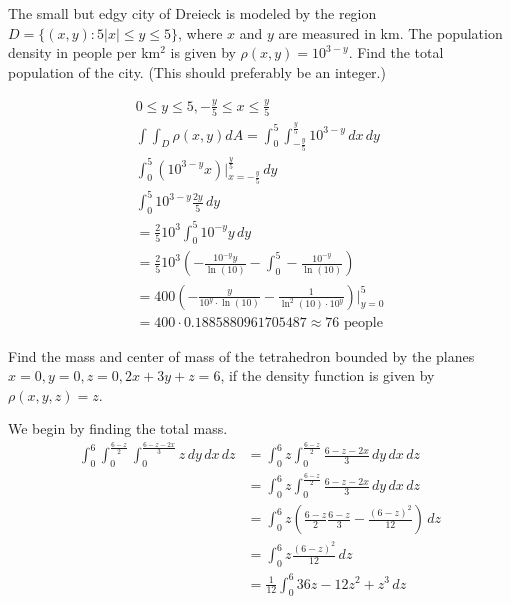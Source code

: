 \documentclass[12pt]{exam}
\begin{document}
\begin{questions}
\question  The small but edgy city of Dreieck is modeled by the region $D = \{ (x, y) : 5 |x| \leq y \leq 5\}$, where $x$ and $y$ are measured in km. The population density in people per km$^2$ is given by $\rho(x, y) = 10^{3-y}$. Find the total population of the city. (This should preferably be an integer.)
    \begin{solution}
        \begin{gather*}
            0 \leq y \leq 5, -\frac{y}{5} \leq x \leq \frac{y}{5} \\
            \int\int_D \rho(x, y) dA = \int_{0}^{5} \int_{-\frac{y}{5}}^{\frac{y}{5}} 10^{3-y} \, dx \, dy \\
            \int_{0}^{5}\left(10^{3-y}x\right)|_{x=-\frac{y}{5}}^{\frac{y}{5}}\, dy\\
            \int_{0}^{5} 10^{3-y} \frac{2y}{5}\, dy \\
            = \frac{2}{5} 10^3\int_{0}^{5} 10^{-y} y\, dy \\
            = \frac{2}{5} 10^3 \left( -\frac{10^{-y}y}{\ln(10)} - \int_{0}^{5}-\frac{10^{-y}}{\ln(10)}\right) \\
            = 400 \left(-\frac{y}{10^y \cdot \ln(10)} - \frac{1}{\ln^2 (10) \cdot 10^y}\right)|_{y=0}^5 \\
            = 400 \cdot 0.1885880961705487 \approx \boxed{76 \text{ people} } \tag*{\qed}
        \end{gather*}
    \end{solution}
    \clearpage
\question  Find the mass and center of mass of the tetrahedron bounded by the planes $x = 0, y = 0, z = 0,
2x + 3y + z = 6$, if the density function is given by $\rho(x, y, z) = z$.
    \begin{solution}
        We begin by finding the total mass.
        \begin{align*}
            \int_{0}^{6}\int_{0}^{\frac{6 - z}{2}}\int_{0}^{\frac{6 - z - 2x}{3}} z\, dy\, dx\, dz &= \int_{0}^{6}z\int_{0}^{\frac{6 - z}{2}}\frac{6 - z - 2x}{3} \, dy\, dx\, dz\\
            &= \int_{0}^{6}z\int_{0}^{\frac{6 - z}{2}} \frac{6 - z - 2x}{3}\, dy\, dx\, dz \\
            &= \int_{0}^{6} z\left(\frac{6 - z}{2} \frac{6 - z}{3} - \frac{(6 - z)^2}{12}\right)\, dz \\
            &= \int_{0}^{6}z \frac{(6 - z)^2}{12} \, dz \\
            &= \frac{1}{12}\int_{0}^{6} 36z - 12z^2 + z^3 \, dz \\

\end{align*}
\end{solution}
\end{questions}
\end{document}
